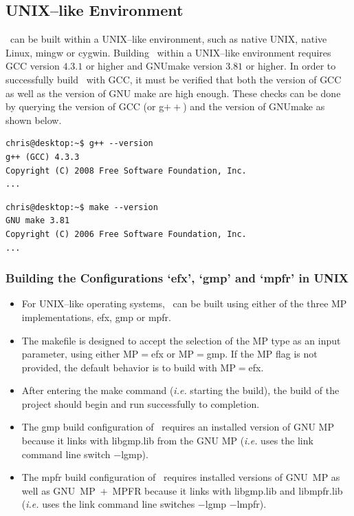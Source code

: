 \subsection{UNIX--like Environment}

\efloat\ can be built within a UNIX--like environment, such as native UNIX,
native Linux, mingw or cygwin. Building \efloat\ within a UNIX--like
environment requires GCC version $4$.$3$.$1$ or higher
and GNUmake version $3$.$81$ or higher.
In order to successfully build \efloat\ with GCC, it must be verified that
both the version of GCC as well as the version of GNU make are high enough.
These checks can be done by querying the version of GCC (or g$++$) and the
version of GNUmake as shown below.

\vspace{6.0pt}

\begin{lstlisting}
chris@desktop:~$ g++ --version
g++ (GCC) 4.3.3
Copyright (C) 2008 Free Software Foundation, Inc.
...
\end{lstlisting}

\vspace{6.0pt}

\begin{lstlisting}
chris@desktop:~$ make --version
GNU make 3.81
Copyright (C) 2006 Free Software Foundation, Inc.
...
\end{lstlisting}

\subsubsection{Building the Configurations `efx', `gmp' and `mpfr' in UNIX}

\begin{itemize}
\item For UNIX--like operating systems, \efloat\ can be built using either of the
three MP implementations, {\courier efx}, {\courier gmp} or {\courier mpfr}.
\item The makefile is designed to accept the selection of the {\courier MP} type as an
input parameter, using either {\courier MP$=$efx} or {\courier MP$=$gmp}.
If the {\courier MP} flag is not provided, the default behavior is to build
with {\courier MP$=$efx}.
\item After entering the make command ({\it i.e.} starting the build), the build of the
project should begin and run successfully to completion.
\item The {\courier gmp} build configuration of \efloat\ requires an installed version of GNU MP
because it links with {\courier libgmp.lib} from the GNU MP ({\it i.e.} uses the
link command line switch $-${\courier lgmp}).
\item The {\courier mpfr} build configuration of \efloat\ requires installed versions of GNU~MP
as well as GNU~MP~$+$~MPFR because it links with {\courier libgmp.lib} and {\courier libmpfr.lib} 
({\it i.e.} uses the link command line switches $-${\courier lgmp} $-${\courier lmpfr}).
\end{itemize}

